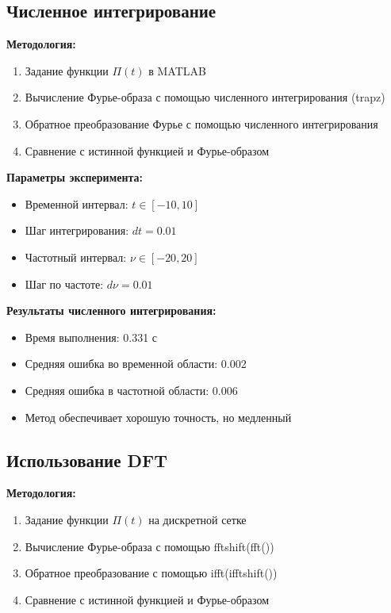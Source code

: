 \subsection*{Численное интегрирование}

\textbf{Методология:}
\begin{enumerate}
    \item Задание функции $\Pi(t)$ в MATLAB
    \item Вычисление Фурье-образа с помощью численного интегрирования (trapz)
    \item Обратное преобразование Фурье с помощью численного интегрирования
    \item Сравнение с истинной функцией и Фурье-образом
\end{enumerate}

\textbf{Параметры эксперимента:}
\begin{itemize}
    \item Временной интервал: $t \in [-10, 10]$
    \item Шаг интегрирования: $dt = 0.01$
    \item Частотный интервал: $\nu \in [-20, 20]$
    \item Шаг по частоте: $d\nu = 0.01$
\end{itemize}

\textbf{Результаты численного интегрирования:}
\begin{itemize}
    \item Время выполнения: 0.331 с
    \item Средняя ошибка во временной области: 0.002
    \item Средняя ошибка в частотной области: 0.006
    \item Метод обеспечивает хорошую точность, но медленный
\end{itemize}

\subsection*{Использование DFT}

\textbf{Методология:}
\begin{enumerate}
    \item Задание функции $\Pi(t)$ на дискретной сетке
    \item Вычисление Фурье-образа с помощью fftshift(fft())
    \item Обратное преобразование с помощью ifft(ifftshift())
    \item Сравнение с истинной функцией и Фурье-образом
\end{enumerate}

